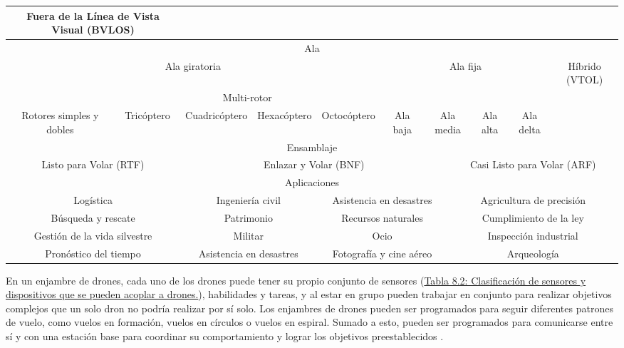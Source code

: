 \begin{table}[h]
{\begin{tabular}{|cccccccccccccccccccccccccc|}
  \multicolumn{8}{c|}{Fuera de la Línea de Vista Visual (BVLOS)} \\ \hline
\multicolumn{26}{|c|}{\cellcolor[HTML]{C0C0C0}Ala} \\ \hline
\multicolumn{15}{|c|}{Ala giratoria} &
  \multicolumn{10}{c|}{Ala fija} &
  Híbrido (VTOL) \\ \hline
\multicolumn{1}{|c|}{} &
  \multicolumn{14}{c|}{Multi-rotor} &
  \multicolumn{4}{c|}{} &
  \multicolumn{2}{c|}{} &
  \multicolumn{2}{c|}{} &
  \multicolumn{2}{c|}{} &
   \\ \cline{2-15}
\multicolumn{1}{|c|}{\multirow{-2}{*}{Rotores simples y dobles}} &
  \multicolumn{3}{c|}{Tricóptero} &
  \multicolumn{5}{c|}{Cuadricóptero} &
  \multicolumn{3}{c|}{Hexacóptero} &
  \multicolumn{3}{c|}{Octocóptero} &
  \multicolumn{4}{c|}{\multirow{-2}{*}{Ala baja}} &
  \multicolumn{2}{c|}{\multirow{-2}{*}{Ala media}} &
  \multicolumn{2}{c|}{\multirow{-2}{*}{Ala alta}} &
  \multicolumn{2}{c|}{\multirow{-2}{*}{Ala delta}} &
  \multirow{-2}{*}{} \\ \hline
  \multicolumn{26}{|c|}{\cellcolor[HTML]{C0C0C0}Ensamblaje} \\ \hline
  \multicolumn{8}{|c|}{Listo para Volar (RTF)} &
  \multicolumn{12}{c|}{Enlazar y Volar (BNF)} &
  \multicolumn{6}{c|}{Casi Listo para Volar (ARF)}
  \\ \hline
  \multicolumn{26}{|c|}{\cellcolor[HTML]{C0C0C0}Aplicaciones} \\ \hline
\multicolumn{4}{|c|}{Logística} &
  \multicolumn{8}{c|}{Ingeniería civil} &
  \multicolumn{8}{c|}{Asistencia en desastres} &
  \multicolumn{6}{c|}{Agricultura de precisión}
  \\ \hline
  \multicolumn{4}{|c|}{Búsqueda y rescate} &
  \multicolumn{8}{c|}{Patrimonio} &
  \multicolumn{8}{c|}{Recursos naturales} &
  \multicolumn{6}{c|}{Cumplimiento de la ley}
  \\ \hline
  \multicolumn{4}{|c|}{Gestión de la vida silvestre} &
  \multicolumn{8}{c|}{Militar} &
  \multicolumn{8}{c|}{Ocio} &
  \multicolumn{6}{c|}{Inspección industrial}
  \\ \hline
  \multicolumn{4}{|c|}{Pronóstico del tiempo} &
  \multicolumn{8}{c|}{Asistencia en desastres} &
  \multicolumn{8}{c|}{Fotografía y cine aéreo} &
  \multicolumn{6}{c|}{Arqueología}
  \\ \hline

\end{tabular}%
}
\end{table}


\noindent En un enjambre de drones, cada uno de los drones puede tener su propio conjunto de sensores (\hyperref[tabla3]{Tabla 8.2: Clasificación de sensores y dispositivos que se pueden acoplar a drones.}), habilidades y tareas, y al estar en grupo pueden trabajar en conjunto para realizar objetivos complejos que un solo dron no podría realizar por sí solo. Los enjambres de drones pueden ser programados para seguir diferentes patrones de vuelo, como vuelos en formación, vuelos en círculos o vuelos en espiral. Sumado a esto, pueden ser programados para comunicarse entre sí y con una estación base para coordinar su comportamiento y lograr los objetivos preestablecidos \cite{51}.
\newpage

